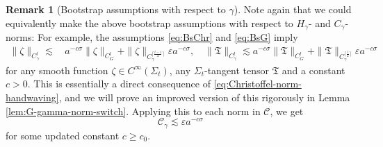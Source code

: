 \documentclass[11pt,leqno,textwidth=10cm]{amsart}
\numberwithin{equation}{section}
\theoremstyle{definition}
\newtheorem{remark}[definition]{Remark}
\theoremstyle{plain}
\newcommand{\1}{\mathbbm{1}}
\renewcommand{\epsilon}{\varepsilon}
\begin{document}
\begin{remark}[Bootstrap assumptions with respect to $\gamma$]\label{rem:Bs-Cgamma}
Note again that we could equivalently make the above bootstrap assumptions with respect to $H_\gamma$- and $C_\gamma$-norms: For example, the assumptions \eqref{eq:BsChr} and \eqref{eq:BsG} imply
\begin{align*}
\|\zeta\|_{C^l_\gamma}\lesssim&\,a^{-c\sigma}\|\zeta\|_{C^l_G}+\|\zeta\|_{C^{\lceil\frac{l-1}2\rceil}_\gamma}\epsilon a^{-c\sigma},\quad
\|\mathfrak{T}\|_{C^l_\gamma}\lesssim a^{-c\sigma}\|\mathfrak{T}\|_{C^l_G}+\|\mathfrak{T}\|_{C^{\lceil\frac{l}2\rceil}_\gamma}\epsilon a^{-c\sigma}
\end{align*}
for any smooth function $\zeta\in C^\infty(\Sigma_t)$, any $\Sigma_t$-tangent tensor $\mathfrak{T}$ and a constant $c>0$. This is essentially a direct consequence of \eqref{eq:Christoffel-norm-handwaving}, and we will prove an improved version of this rigorously in Lemma \ref{lem:G-gamma-norm-switch}. Applying this to each norm in $\mathcal{C}$, we get
\begin{equation}\label{eq:BsCgamma}
\mathcal{C}_\gamma\lesssim\epsilon a^{-c\sigma}
\end{equation} 
for some updated constant $c\geq c_0$.
\end{remark}
\end{document}
